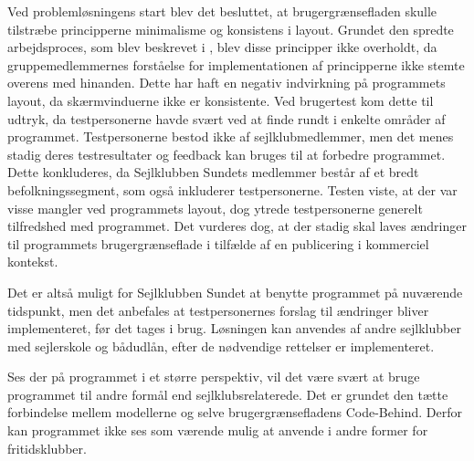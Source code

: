 Ved problemløsningens start blev det besluttet, at brugergrænsefladen skulle tilstræbe principperne minimalisme og konsistens i layout.
Grundet den spredte arbejdsproces, som blev beskrevet i , blev disse principper ikke overholdt, da gruppemedlemmernes forståelse for implementationen af principperne ikke stemte overens med hinanden.
Dette har haft en negativ indvirkning på programmets layout, da skærmvinduerne ikke er konsistente.
Ved brugertest kom dette til udtryk, da testpersonerne havde svært ved at finde rundt i enkelte områder af programmet. 
Testpersonerne bestod ikke af sejlklubmedlemmer, men det menes stadig deres testresultater og feedback kan bruges til at forbedre programmet.
Dette konkluderes, da Sejlklubben Sundets medlemmer består af et bredt befolkningssegment, som også inkluderer testpersonerne.
Testen viste, at der var visse mangler ved programmets layout, dog ytrede testpersonerne generelt tilfredshed med programmet.
Det vurderes dog, at der stadig skal laves ændringer til programmets brugergrænseflade i tilfælde af en publicering i kommerciel kontekst. 

Det er altså muligt for Sejlklubben Sundet at benytte programmet på nuværende tidspunkt, men det anbefales at testpersonernes forslag til ændringer bliver implementeret, før det tages i brug.
Løsningen kan anvendes af andre sejlklubber med sejlerskole og bådudlån, efter de nødvendige rettelser er implementeret. 

Ses der på programmet i et større perspektiv, vil det være svært at bruge programmet til andre formål end sejlklubsrelaterede. 
Det er grundet den tætte forbindelse mellem modellerne og selve brugergrænsefladens Code-Behind. 
Derfor kan programmet ikke ses som værende mulig at anvende i andre former for fritidsklubber. 

